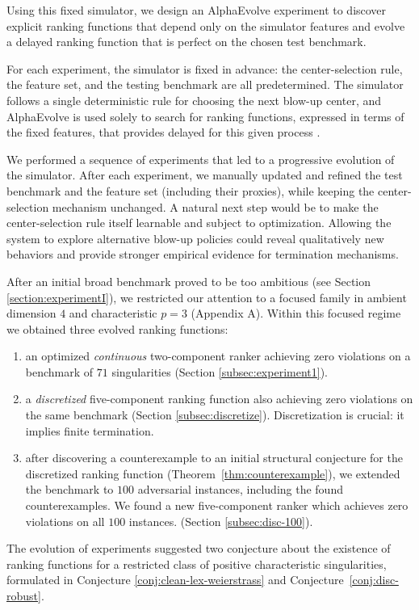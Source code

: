\documentclass[11pt]{amsart}
\begin{document}
Using this fixed simulator, we design an AlphaEvolve experiment to discover explicit ranking functions that depend only on the simulator features and evolve a delayed ranking function that is perfect on the chosen test benchmark.

For each experiment, the simulator is fixed in advance: the center-selection rule, the feature set, and the testing benchmark are all predetermined. The simulator follows a single deterministic rule for choosing the next blow-up center, and AlphaEvolve is used solely to search for ranking functions, expressed in terms of the fixed features, that provides delayed  for this given process \cite{NovikovEtAl2025AlphaEvolve,AlphaEvolve2025Scale}.

We performed a sequence of experiments that led to a progressive evolution of the simulator. After each experiment, we manually updated and refined the test benchmark and the feature set (including their proxies), while keeping the center-selection mechanism unchanged. A natural next step would be to make the center-selection rule itself learnable and subject to optimization. Allowing the system to explore alternative blow-up policies could reveal qualitatively new behaviors and provide stronger empirical evidence for termination mechanisms.

After an initial broad benchmark proved to be too ambitious (see Section \ref{section:experimentI}), we restricted our attention to a focused family in
ambient dimension $4$ and characteristic $p=3$ (Appendix A).
Within this focused regime we obtained three evolved ranking functions:
\begin{enumerate}
\item an optimized \emph{continuous} two-component ranker achieving zero violations on a benchmark of $71$ singularities (Section \ref{subsec:experiment1}).
\item a \emph{discretized} five-component ranking function also achieving zero violations on the same benchmark (Section \ref{subsec:discretize}). Discretization is crucial: it implies finite termination.  
\item after discovering a counterexample to an initial structural conjecture for the discretized ranking function
(Theorem~\ref{thm:counterexample}), we extended the benchmark to $100$ adversarial instances, including the found counterexamples. We found a 
new five-component ranker which achieves zero violations on all $100$ instances. 
(Section \ref{subsec:disc-100}).
\end{enumerate}
The evolution of experiments suggested two conjecture about the existence of ranking functions for a restricted class of positive
characteristic singularities, formulated in Conjecture \ref{conj:clean-lex-weierstrass} and
Conjecture~\ref{conj:disc-robust}.
\end{document}

